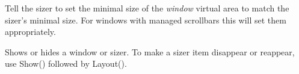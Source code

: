 Tell the sizer to set the minimal size of the {\it window} virtual area to match the sizer's
minimal size. For windows with managed scrollbars this will set them appropriately.



\label{wxsizershow}



Shows or hides a window or sizer. To make a sizer item disappear or 
reappear, use Show() followed by Layout().

